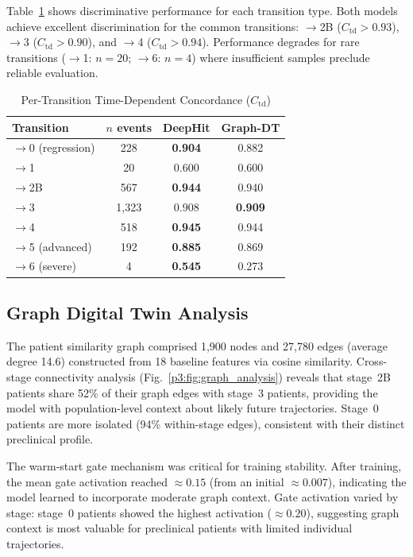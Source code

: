 Table~\ref{p3:tab:pertrans} shows discriminative performance for each transition type. Both models achieve excellent discrimination for the common transitions: $\to$2B ($C_\text{td} > 0.93$), $\to$3 ($C_\text{td} > 0.90$), and $\to$4 ($C_\text{td} > 0.94$). Performance degrades for rare transitions ($\to$1: $n{=}20$; $\to$6: $n{=}4$) where insufficient samples preclude reliable evaluation.

\begin{table}[!t]
\centering
\caption{Per-Transition Time-Dependent Concordance ($C_\text{td}$)}
\label{p3:tab:pertrans}
\small
\begin{tabular}{lccc}
\toprule
Transition & $n$ events & DeepHit & Graph-DT \\
\midrule
$\to$0 (regression) & 228 & \textbf{0.904} & 0.882 \\
$\to$1 & 20 & 0.600 & 0.600 \\
$\to$2B & 567 & \textbf{0.944} & 0.940 \\
$\to$3 & 1,323 & 0.908 & \textbf{0.909} \\
$\to$4 & 518 & \textbf{0.945} & 0.944 \\
$\to$5 (advanced) & 192 & \textbf{0.885} & 0.869 \\
$\to$6 (severe) & 4 & \textbf{0.545} & 0.273 \\
\bottomrule
\end{tabular}
\end{table}

\subsection{Graph Digital Twin Analysis}

The patient similarity graph comprised 1,900 nodes and 27,780 edges (average degree 14.6) constructed from 18 baseline features via cosine similarity. Cross-stage connectivity analysis (Fig.~\ref{p3:fig:graph_analysis}) reveals that stage~2B patients share 52\% of their graph edges with stage~3 patients, providing the model with population-level context about likely future trajectories. Stage~0 patients are more isolated (94\% within-stage edges), consistent with their distinct preclinical profile.

The warm-start gate mechanism was critical for training stability. After training, the mean gate activation reached ${\approx}0.15$ (from an initial ${\approx}0.007$), indicating the model learned to incorporate moderate graph context. Gate activation varied by stage: stage~0 patients showed the highest activation (${\approx}0.20$), suggesting graph context is most valuable for preclinical patients with limited individual trajectories.

